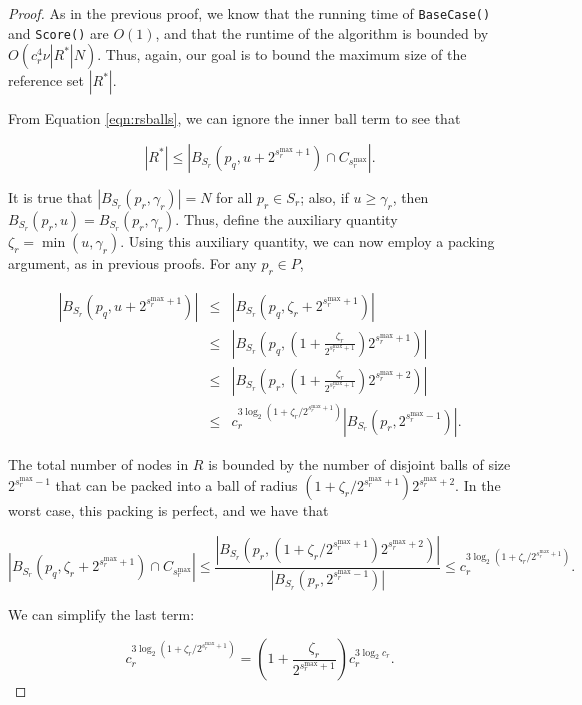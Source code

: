 \begin{proof}
As in the previous proof, we know that the running time of \texttt{BaseCase()}
and \texttt{Score()} are $O(1)$, and that the runtime of the algorithm is
bounded by $O(c_r^4 \nu |R^*| N)$.  Thus, again, our goal is to bound the
maximum size of the reference set $| R^* |$.

From Equation \ref{eqn:rsballs}, we can ignore the inner ball term to see that

\begin{equation}
|R^*| \le \left| B_{S_r}(p_q, u + 2^{s_r^{\max} + 1}) \cap C_{s_r^{\max}}
\right|.
\end{equation}

It is true that $|B_{S_r}(p_r, \gamma_r)| = N$ for all $p_r \in S_r$; also, if
$u \ge \gamma_r$, then $B_{S_r}(p_r, u) = B_{S_r}(p_r, \gamma_r)$.  Thus, define
the auxiliary quantity $\zeta_r = \min (u, \gamma_r)$.  Using this auxiliary
quantity, we can now employ a packing argument, as in previous proofs.  For any
$p_r \in P$,

\begin{eqnarray}
|B_{S_r}(p_q, u + 2^{s_r^{\max} + 1})| &\le& |B_{S_r}(p_q, \zeta_r +
2^{s_r^{\max} + 1})| \\
 &\le& |B_{S_r}(p_q, (1 + \frac{\zeta_r}{2^{s_r^{\max} + 1}}) 2^{s_r^{\max} +
1})| \\
 &\le& |B_{S_r}(p_r, (1 + \frac{\zeta_r}{2^{s_r^{\max} + 1}}) 2^{s_r^{\max} +
2})| \\
 &\le& c_r^{3 \log_2{(1 + \zeta_r / 2^{s_r^{\max} + 1})}} | B_{S_r}(p_r,
2^{s_r^{\max} - 1})|.
\end{eqnarray}

The total number of nodes in $R$ is bounded by the number of disjoint balls of
size $2^{s_r^{\max} - 1}$ that can be packed into a ball of radius $(1 + \zeta_r
/ 2^{s_r^{\max} + 1}) 2^{s_r^{\max} + 2}$.  In the worst case, this packing is
perfect, and we have that

\begin{equation}
\left| B_{S_r}(p_q, \zeta_r + 2^{s_r^{\max} + 1}) \cap C_{s_r^{\max}} \right|
\le
\frac{| B_{S_r}(p_r, (1 + \zeta_r / 2^{s_r^{\max} + 1}) 2^{s_r^{\max} + 2}) |}{|
B_{S_r}(p_r, 2^{s_r^{\max} - 1}) |} \le c_r^{3 \log_2{(1 + \zeta_r /
2^{s_r^{\max} + 1})}}.
\end{equation}

We can simplify the last term:

\begin{equation}
c_r^{3 \log_2(1 + \zeta_r / 2^{s_r^{\max} + 1})} = (1 +
\frac{\zeta_r}{2^{s_r^{\max} + 1}}) c_r^{3 \log_2 c_r}.
\end{equation}


\end{proof}
